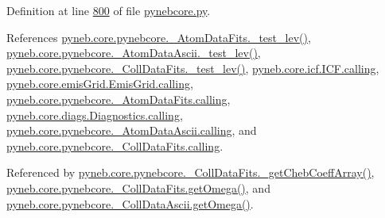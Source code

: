 Definition at line \hyperlink{pynebcore_8py_source_l00800}{800} of file \hyperlink{pynebcore_8py_source}{pynebcore.\-py}.



References \hyperlink{pynebcore_8py_source_l00178}{pyneb.\-core.\-pynebcore.\-\_\-\-Atom\-Data\-Fits.\-\_\-test\-\_\-lev()}, \hyperlink{pynebcore_8py_source_l00447}{pyneb.\-core.\-pynebcore.\-\_\-\-Atom\-Data\-Ascii.\-\_\-test\-\_\-lev()}, \hyperlink{pynebcore_8py_source_l00677}{pyneb.\-core.\-pynebcore.\-\_\-\-Coll\-Data\-Fits.\-\_\-test\-\_\-lev()}, \hyperlink{icf_8py_source_l00016}{pyneb.\-core.\-icf.\-I\-C\-F.\-calling}, \hyperlink{emis_grid_8py_source_l00044}{pyneb.\-core.\-emis\-Grid.\-Emis\-Grid.\-calling}, \hyperlink{pynebcore_8py_source_l00097}{pyneb.\-core.\-pynebcore.\-\_\-\-Atom\-Data\-Fits.\-calling}, \hyperlink{diags_8py_source_l00169}{pyneb.\-core.\-diags.\-Diagnostics.\-calling}, \hyperlink{pynebcore_8py_source_l00318}{pyneb.\-core.\-pynebcore.\-\_\-\-Atom\-Data\-Ascii.\-calling}, and \hyperlink{pynebcore_8py_source_l00585}{pyneb.\-core.\-pynebcore.\-\_\-\-Coll\-Data\-Fits.\-calling}.



Referenced by \hyperlink{pynebcore_8py_source_l00751}{pyneb.\-core.\-pynebcore.\-\_\-\-Coll\-Data\-Fits.\-\_\-get\-Cheb\-Coeff\-Array()}, \hyperlink{pynebcore_8py_source_l00828}{pyneb.\-core.\-pynebcore.\-\_\-\-Coll\-Data\-Fits.\-get\-Omega()}, and \hyperlink{pynebcore_8py_source_l01082}{pyneb.\-core.\-pynebcore.\-\_\-\-Coll\-Data\-Ascii.\-get\-Omega()}.


